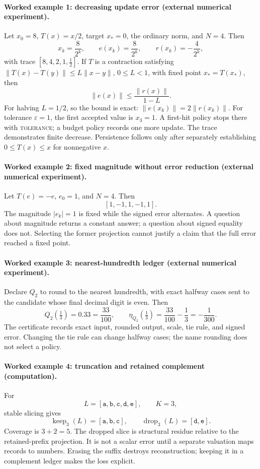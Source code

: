 \paragraph{Worked example 1: decreasing update error (external numerical experiment).}
Let \(x_0=8\), \(T(x)=x/2\), target \(x_*=0\), the ordinary norm, and \(N=4\).  Then
\[
 x_k=\frac{8}{2^k},\qquad e(x_k)=\frac{8}{2^k},\qquad
 r(x_k)=-\frac{4}{2^k},
\]
with trace \([8,4,2,1,\tfrac12]\).  If \(T\) is a contraction satisfying
\(\|T(x)-T(y)\|\le L\|x-y\|\), \(0\le L<1\), with fixed point \(x_*=T(x_*)\), then
\[
                  \|e(x)\|\le\frac{\|r(x)\|}{1-L}.
\]
For halving \(L=1/2\), so the bound is exact: \(\|e(x_k)\|=2\|r(x_k)\|\).
For tolerance \(\varepsilon=1\), the first accepted value is \(x_3=1\).  A first-hit policy stops there with
\textsc{tolerance}; a budget policy records one more update.  The trace demonstrates finite decrease.  Persistence
follows only after separately establishing \(0\le T(x)\le x\) for nonnegative \(x\).

\paragraph{Worked example 2: fixed magnitude without error reduction (external numerical experiment).}
Let \(T(e)=-e\), \(e_0=1\), and \(N=4\).  Then
\[
                         [1,-1,1,-1,1].
\]
The magnitude \(|e_k|=1\) is fixed while the signed error alternates.  A question about magnitude returns a constant
answer; a question about signed equality does not.  Selecting the former projection cannot justify a claim that the
full error reached a fixed point.

\paragraph{Worked example 3: nearest-hundredth ledger (external numerical experiment).}
Declare \(Q_2\) to round to the nearest hundredth, with exact halfway cases sent to the candidate whose final decimal
digit is even.  Then
\[
 Q_2(\tfrac13)=0.33=\frac{33}{100},\qquad
 \eta_{Q_2}(\tfrac13)=\frac{33}{100}-\frac13=-\frac1{300}.
\]
The certificate records exact input, rounded output, scale, tie rule, and signed error.  Changing the tie rule can
change halfway cases; the name rounding does not select a policy.

\paragraph{Worked example 4: truncation and retained complement (computation).}
For
\[
 L=[\mathtt a,\mathtt b,\mathtt c,\mathtt d,\mathtt e],\qquad K=3,
\]
stable slicing gives
\[
 \operatorname{keep}_3(L)=[\mathtt a,\mathtt b,\mathtt c],\qquad
 \operatorname{drop}_3(L)=[\mathtt d,\mathtt e].
\]
Coverage is \(3+2=5\).  The dropped slice is structural residue relative to the retained-prefix projection.  It is not
a scalar error until a separate valuation maps records to numbers.  Erasing the suffix destroys reconstruction; keeping
it in a complement ledger makes the loss explicit.

